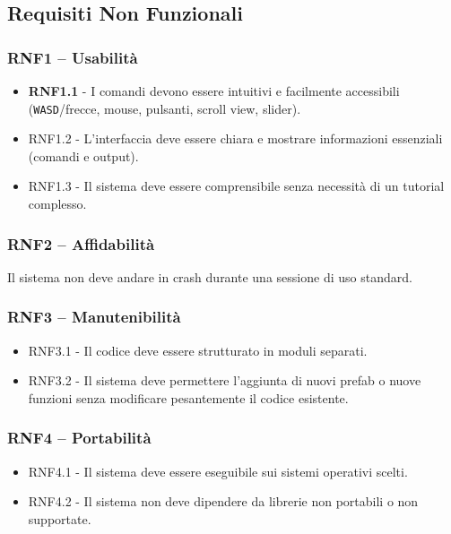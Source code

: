\subsection{Requisiti Non Funzionali}
\subsubsection{RNF1 – Usabilità}

\begin{itemize}
  \item \textbf{RNF1.1} - I comandi devono essere intuitivi e facilmente accessibili
    (\texttt{WASD}/frecce, mouse, pulsanti, scroll view, slider).
  \item RNF1.2 - L'interfaccia deve essere chiara e mostrare informazioni essenziali
    (comandi e output).
  \item RNF1.3 - Il sistema deve essere comprensibile senza necessità di un tutorial complesso.
\end{itemize}

\subsubsection{RNF2 – Affidabilità}  Il sistema non deve andare in crash durante una sessione di uso standard.


\subsubsection{RNF3 – Manutenibilità}
\begin{itemize}
  \item RNF3.1 - Il codice deve essere strutturato in moduli separati.
  \item RNF3.2 - Il sistema deve permettere l'aggiunta di nuovi prefab o nuove funzioni senza
    modificare pesantemente il codice esistente.
\end{itemize}

\subsubsection{RNF4 – Portabilità}

\begin{itemize}
  \item RNF4.1 - Il sistema deve essere eseguibile sui sistemi operativi scelti.
  \item RNF4.2 - Il sistema non deve dipendere da librerie non portabili o non supportate.
\end{itemize}

